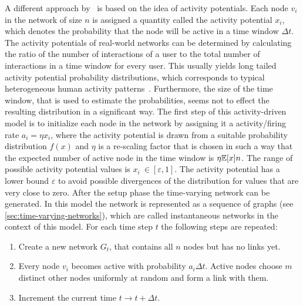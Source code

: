 A different approach by~\citet{Perra2012a} is based on the idea of activity potentials.
Each node \(v_{i}\) in the network of size \( n \) is assigned a quantity called the activity potential \(x_{i}\), which denotes the probability that the node will be active in a time window \(\Delta t\).
The activity potentials of real-world networks can be determined by calculating the ratio of the number of interactions of a user to the total number of interactions in a time window for every user.
This usually yields long tailed activity potential probability distributions, which corresponds to typical heterogeneous human activity patterns~\cite{Vazquez2006, Jo2012}.
Furthermore, the size of the time window, that is used to estimate the probabilities, seems not to effect the resulting distribution in a significant way.
The first step of this activity-driven model is to initialize each node in the network by assigning it a activity/firing rate \(a_{i} = \eta x_{i}\), where the activity potential is drawn from a suitable probability distribution \( f(x) \) and \( \eta \) is a re-scaling factor that is chosen in such a way that the expected number of active node in the time window is \(\eta \mathbb{E}[{x}] n\).
The range of possible activity potential values is \(x_{i}\ \in [\varepsilon, 1]\).
The activity potential has a lower bound \( \varepsilon \) to avoid possible divergences of the distribution for values that are very close to zero.
After the setup phase the time-varying network can be generated.
In this model the network is represented as a sequence of graphs (see \autoref{sec:time-varying-networks}), which are called instantaneous networks in the context of this model.
For each time step \(t\) the following steps are repeated:

\begin{enumerate}
    \item Create a new network \(G_{t}\), that contains all \( n \) nodes but has no links yet.
    \item Every node \(v_{i}\) becomes active with probability \(a_{i} \Delta t\). Active nodes choose \(m\) distinct other nodes uniformly at random and form a link with them.
    \item Increment the current time \(t \rightarrow t + \Delta t\).
\end{enumerate}

